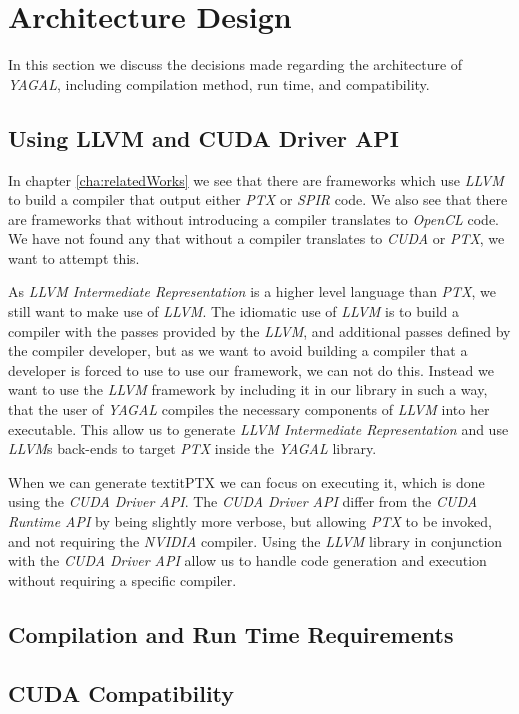 \section{Architecture Design}
In this section we discuss the decisions made regarding the architecture of \textit{YAGAL}, including compilation method, run time, and compatibility.

\subsection{Using LLVM and CUDA Driver API}
In chapter \ref{cha:relatedWorks} we see that there are frameworks which use \textit{LLVM} to build a compiler that output either \textit{PTX} or \textit{SPIR} code. We also see that there are frameworks that without introducing a compiler translates to \textit{OpenCL} code. We have not found any that without a compiler translates to \textit{CUDA} or \textit{PTX}, we want to attempt this.

As \textit{LLVM Intermediate Representation} is a higher level language than \textit{PTX}, we still want to make use of \textit{LLVM}. The idiomatic use of \textit{LLVM} is to build a compiler with the passes provided by the \textit{LLVM}, and additional passes defined by the compiler developer, but as we want to avoid building a compiler that a developer is forced to use to use our framework, we can not do this. Instead we want to use the \textit{LLVM} framework by including it in our library in such a way, that the user of \textit{YAGAL} compiles the necessary components of \textit{LLVM} into her executable. This allow us to generate \textit{LLVM Intermediate Representation} and use \textit{LLVM}s back-ends to target \textit{PTX} inside the \textit{YAGAL} library.

When we can generate textit{PTX} we can focus on executing it, which is done using the \textit{CUDA Driver API}. The \textit{CUDA Driver API} differ from the \textit{CUDA Runtime API} by being slightly more verbose, but allowing \textit{PTX} to be invoked, and not requiring the \textit{NVIDIA} compiler. Using the \textit{LLVM} library in conjunction with the \textit{CUDA Driver API} allow us to handle code generation and execution without requiring a specific compiler.

\subsection{Compilation and Run Time Requirements}

\subsection{CUDA Compatibility}
